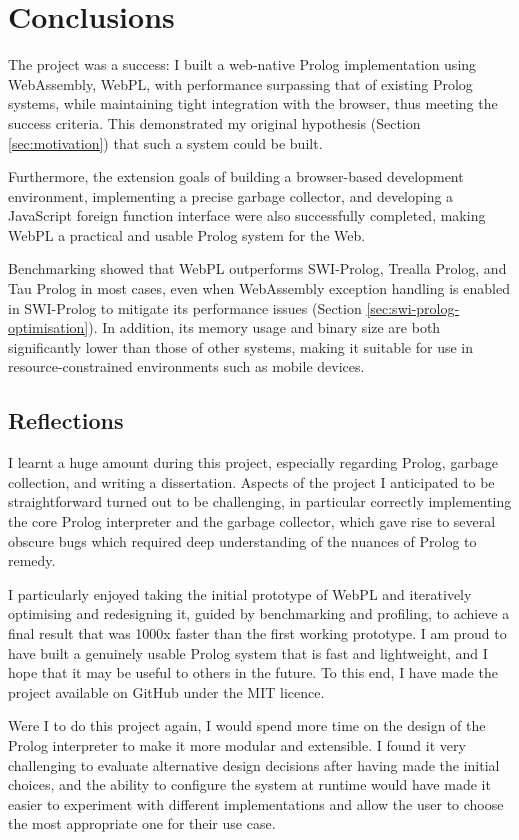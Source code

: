 \chapter{Conclusions}

The project was a success: I built a web-native Prolog implementation using WebAssembly, WebPL, with performance surpassing that of existing Prolog systems, while maintaining tight integration with the browser, thus meeting the success criteria. This demonstrated my original hypothesis (Section \ref{sec:motivation}) that such a system could be built.

Furthermore, the extension goals of building a browser-based development environment, implementing a precise garbage collector, and developing a JavaScript foreign function interface were also successfully completed, making WebPL a practical and usable Prolog system for the Web.

Benchmarking showed that WebPL outperforms SWI-Prolog, Trealla Prolog, and Tau Prolog in most cases, even when WebAssembly exception handling is enabled in SWI-Prolog to mitigate its performance issues (Section \ref{sec:swi-prolog-optimisation}). In addition, its memory usage and binary size are both significantly lower than those of other systems, making it suitable for use in resource-constrained environments such as mobile devices.

\section{Reflections}

I learnt a huge amount during this project, especially regarding Prolog, garbage collection, and writing a dissertation. Aspects of the project I anticipated to be straightforward turned out to be challenging, in particular correctly implementing the core Prolog interpreter and the garbage collector, which gave rise to several obscure bugs which required deep understanding of the nuances of Prolog to remedy.

I particularly enjoyed taking the initial prototype of WebPL and iteratively optimising and redesigning it, guided by benchmarking and profiling, to achieve a final result that was 1000x faster than the first working prototype. I am proud to have built a genuinely usable Prolog system that is fast and lightweight, and I hope that it may be useful to others in the future. To this end, I have made the project available on GitHub under the MIT licence.

Were I to do this project again, I would spend more time on the design of the Prolog interpreter to make it more modular and extensible. I found it very challenging to evaluate alternative design decisions after having made the initial choices, and the ability to configure the system at runtime would have made it easier to experiment with different implementations and allow the user to choose the most appropriate one for their use case.

